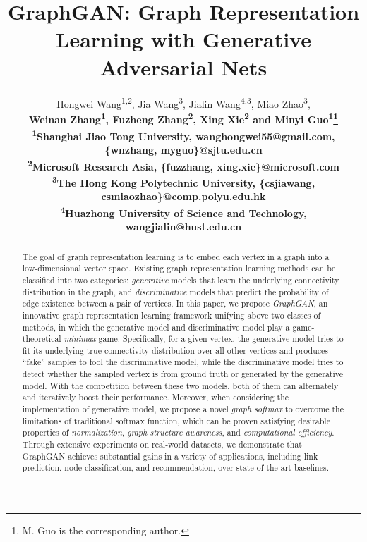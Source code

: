 \documentclass[letterpaper]{article}
\begin{document}
 
\title{GraphGAN: Graph Representation Learning with Generative Adversarial Nets}

\author{Hongwei Wang\textsuperscript{1,2}, Jia Wang\textsuperscript{3}, Jialin Wang\textsuperscript{4,3}, Miao Zhao\textsuperscript{3},\\
\bf \Large  Weinan Zhang\textsuperscript{1}, Fuzheng Zhang\textsuperscript{2}, Xing Xie\textsuperscript{2} and Minyi Guo\textsuperscript{1}\thanks{M. Guo is the corresponding author.}\\
\textsuperscript{1}Shanghai Jiao Tong University, wanghongwei55@gmail.com, \{wnzhang, myguo\}@sjtu.edu.cn\\
\textsuperscript{2}Microsoft Research Asia, \{fuzzhang, xing.xie\}@microsoft.com\\
\textsuperscript{3}The Hong Kong Polytechnic University, \{csjiawang, csmiaozhao\}@comp.polyu.edu.hk\\
\textsuperscript{4}Huazhong University of Science and Technology, wangjialin@hust.edu.cn
}

\maketitle

\begin{abstract}
	The goal of graph representation learning is to embed each vertex in a graph into a low-dimensional vector space.
	Existing graph representation learning methods can be classified into two categories: \textit{generative} models that learn the underlying connectivity distribution in the graph, and \textit{discriminative} models that predict the probability of edge existence between a pair of vertices.
	In this paper, we propose \textit{GraphGAN}, an innovative graph representation learning framework unifying above two classes of methods, in which the generative model and discriminative model play a game-theoretical \textit{minimax} game.
	Specifically, for a given vertex, the generative model tries to fit its underlying true connectivity distribution over all other vertices and produces ``fake'' samples to fool the discriminative model, while the discriminative model tries to detect whether the sampled vertex is from ground truth or generated by the generative model.
	With the competition between these two models, both of them can alternately and iteratively boost their performance.
	Moreover, when considering the implementation of generative model, we propose a novel \textit{graph softmax} to overcome the limitations of traditional softmax function, which can be proven satisfying desirable properties of \textit{normalization}, \textit{graph structure awareness}, and \textit{computational efficiency}.
	Through extensive experiments on real-world datasets, we demonstrate that GraphGAN achieves substantial gains in a variety of applications, including link prediction, node classification, and recommendation, over state-of-the-art baselines.
\end{abstract}
\end{document}

